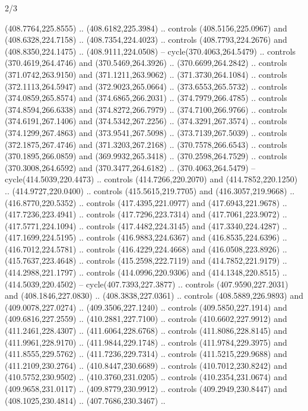 \begin{flagdescription}{2/3}
\begin{scope}[xshift=0.5\flaglength,yshift=0.5\flagwidth,scale=\flagwidth/495.65]
\begin{scope}[y=0.8pt, x=0.8pt, yscale=-1,shift={(-463.76,-309.78)}]
  (408.7764,225.8555) .. (408.6182,225.3984) .. controls (408.5156,225.0967) and
  (408.6328,224.7158) .. (408.7354,224.4023) .. controls (408.7793,224.2676) and
  (408.8350,224.1475) .. (408.9111,224.0508) -- cycle(370.4063,264.5479) ..
  controls (370.4619,264.4746) and (370.5469,264.3926) .. (370.6699,264.2842) ..
  controls (371.0742,263.9150) and (371.1211,263.9062) .. (371.3730,264.1084) ..
  controls (372.1113,264.5947) and (372.9023,265.0664) .. (373.6553,265.5732) ..
  controls (374.0859,265.8574) and (374.6865,266.2031) .. (374.7979,266.4785) ..
  controls (374.8594,266.6338) and (374.8272,266.7979) .. (374.7100,266.9766) ..
  controls (374.6191,267.1406) and (374.5342,267.2256) .. (374.3291,267.3574) ..
  controls (374.1299,267.4863) and (373.9541,267.5098) .. (373.7139,267.5039) ..
  controls (372.1875,267.4746) and (371.3203,267.2168) .. (370.7578,266.6543) ..
  controls (370.1895,266.0859) and (369.9932,265.3418) .. (370.2598,264.7529) ..
  controls (370.3008,264.6592) and (370.3477,264.6182) .. (370.4063,264.5479) --
  cycle(414.5039,220.4473) .. controls (414.7266,220.2070) and
  (414.7852,220.1250) .. (414.9727,220.0400) .. controls (415.5615,219.7705) and
  (416.3057,219.9668) .. (416.8770,220.5352) .. controls (417.4395,221.0977) and
  (417.6943,221.9678) .. (417.7236,223.4941) .. controls (417.7296,223.7314) and
  (417.7061,223.9072) .. (417.5771,224.1094) .. controls (417.4482,224.3145) and
  (417.3340,224.4287) .. (417.1699,224.5195) .. controls (416.9883,224.6367) and
  (416.8535,224.6396) .. (416.7012,224.5781) .. controls (416.4229,224.4668) and
  (416.0508,223.8926) .. (415.7637,223.4648) .. controls (415.2598,222.7119) and
  (414.7852,221.9179) .. (414.2988,221.1797) .. controls (414.0996,220.9306) and
  (414.1348,220.8515) .. (414.5039,220.4502) -- cycle(407.7393,227.3877) ..
  controls (407.9590,227.2031) and (408.1846,227.0830) .. (408.3838,227.0361) ..
  controls (408.5889,226.9893) and (409.0078,227.0274) .. (409.3506,227.1240) ..
  controls (409.5850,227.1914) and (409.6816,227.2559) .. (410.2881,227.7100) ..
  controls (410.6602,227.9912) and (411.2461,228.4307) .. (411.6064,228.6768) ..
  controls (411.8086,228.8145) and (411.9961,228.9170) .. (411.9844,229.1748) ..
  controls (411.9784,229.3975) and (411.8555,229.5762) .. (411.7236,229.7314) ..
  controls (411.5215,229.9688) and (411.2109,230.2764) .. (410.8447,230.6689) ..
  controls (410.7012,230.8242) and (410.5752,230.9502) .. (410.3760,231.0205) ..
  controls (410.2354,231.0674) and (409.9658,231.0117) .. (409.8779,230.9912) ..
  controls (409.2949,230.8447) and (408.1025,230.4814) .. (407.7686,230.3467) ..

\end{scope}
\end{scope}
\end{flagdescription}
